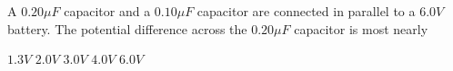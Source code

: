 \begin{questions}\setcounter{question}{2}\question
A $0.20 \unit{\mu F}$ capacitor and a $0.10 \unit{\mu F}$ capacitor are connected in parallel to a $6.0 \unit{V}$ battery. The potential difference across the $0.20 \unit{\mu F}$ capacitor is most nearly

\begin{oneparchoices}
\choice $1.3 \unit{V}$
\choice $2.0 \unit{V}$
\choice $3.0 \unit{V}$
\choice $4.0 \unit{V}$
\choice $6.0 \unit{V}$
\end{oneparchoices}\end{questions}

